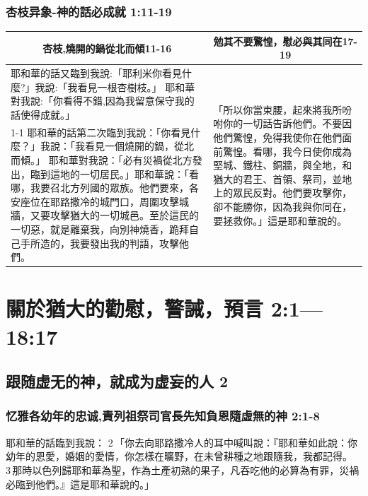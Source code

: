 \subsubsection{杏枝异象-神的話必成就 1:11-19}
\begin{table}[H]
\centering
\begin{tabular}{p{11.25cm}|p{5.50cm}}\hline\hline
\multicolumn{1}{c|}{杏枝,燒開的鍋從北而傾11-16}&\multicolumn{1}{c}{勉其不要驚惶，慰必與其同在17-19}\\\hline
耶和華的話又臨到我說:「耶利米你看見什麼?」我說:「我看見一根杏樹枝。」 耶和華對我說:「你看得不錯,因為我留意保守我的話使得成就。」
&\multirow{2}{5.86cm}{「所以你當束腰，起來將我所吩咐你的一切話告訴他們。不要因他們驚惶，免得我使你在他們面前驚惶。看哪，我今日使你成為堅城、鐵柱、銅牆，與全地，和猶大的君王、首領、祭司，並地上的眾民反對。他們要攻擊你，卻不能勝你，因為我與你同在，要拯救你。」這是耶和華說的。}\\\cline{1-1}
耶和華的話第二次臨到我說：「你看見什麼？」我說：「我看見一個燒開的鍋，從北而傾。」 耶和華對我說：「必有災禍從北方發出，臨到這地的一切居民。」耶和華說：「看哪，我要召北方列國的眾族。他們要來，各安座位在耶路撒冷的城門口，周圍攻擊城牆，又要攻擊猶大的一切城邑。至於這民的一切惡，就是離棄我，向別神燒香，跪拜自己手所造的，我要發出我的判語，攻擊他們。&\\\hline
\end{tabular}
\end{table}

\section{關於猶大的勸慰，警誡，預言 2:1—18:17}
\subsection{跟随虚无的神，就成为虚妄的人 2}
\subsubsection{忆雅各幼年的忠诚,責列祖祭司官長先知負恩隨虛無的神 2:1-8}
耶和華的話臨到我說： 2 「你去向耶路撒冷人的耳中喊叫說：『耶和華如此說：你幼年的恩愛，婚姻的愛情，你怎樣在曠野，在未曾耕種之地跟隨我，我都記得。 3 那時以色列歸耶和華為聖，作為土產初熟的果子，凡吞吃他的必算為有罪，災禍必臨到他們。』這是耶和華說的。」


